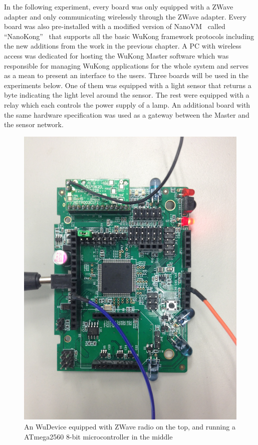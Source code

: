 In the following experiment, every board was only equipped with a ZWave adapter
and only communicating wirelessly through the ZWave adapter.  Every board was
also pre-installed with a modified version of NanoVM~\cite{Harbaum2006} called
“NanoKong”~\cite{Su} that supports all the basic WuKong framework protocols
including the new additions from the work in the previous chapter.  A PC with
wireless access was dedicated for hosting the WuKong Master software which was
responsible for managing WuKong applications for the whole system and serves as
a mean to present an interface to the users.  Three boards will be used in the
experiments below. One of them was equipped with a light sensor that returns
a byte indicating the light level around the sensor.  The rest were equipped
with a relay which each controls the power supply of a lamp.  An additional
board with the same hardware specification was used as a gateway between the
Master and the sensor network.

\begin{figure}[h!]
\centering
    \includegraphics[width=\linewidth]{figures/wudevice}
\caption{An WuDevice equipped with ZWave radio on the top, and running
  a ATmega2560 8-bit microcontroller in the middle}
\label{fig:wudevice}
\end{figure}

